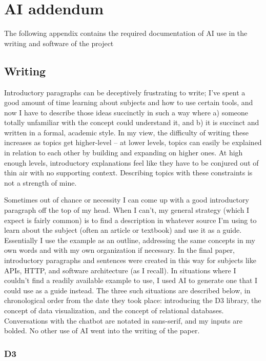 \chapter{AI addendum}

The following appendix contains the required documentation of AI use in the writing and software of the project

\section{Writing}

Introductory paragraphs can be deceptively frustrating to write; I've spent a good amount of time learning about subjects and how to use certain tools, and now I have to describe those ideas succinctly in such a way where a) someone totally unfamiliar with the concept could understand it, and b) it is succinct and written in a formal, academic style. In my view, the difficulty of writing these increases as topics get higher-level -- at lower levels, topics can easily be explained in relation to each other by building and expanding on higher ones. At high enough levels, introductory explanations feel like they have to be conjured out of thin air with no supporting context. Describing topics with these constraints is not a strength of mine.

Sometimes out of chance or necessity I can come up with a good introductory paragraph off the top of my head. When I can't, my general strategy (which I expect is fairly common) is to find a description in whatever source I'm using to learn about the subject (often an article or textbook) and use it as a guide. Essentially I use the example as an outline, addressing the same concepts in my own words and with my own organization if necessary. In the final paper, introductory paragraphs and sentences were created in this way for subjects like APIs, HTTP, and software architecture (as I recall). In situations where I couldn't find a readily available example to use, I used AI to generate one that I could use as a guide instead. The three such situations are described below, in chronological order from the date they took place: introducing the D3 library, the concept of data visualization, and the concept of relational databases. Conversations with the chatbot are notated in sans-serif, and my inputs are bolded. No other use of AI went into the writing of the paper.

\subsection{D3}

